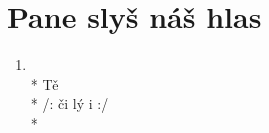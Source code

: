 \section{Pane slyš náš hlas}
\begin{enumerate}
\item[]    \\*
 Tě   \\*
/:   či lý  i  :/ \\*
\end{enumerate}
